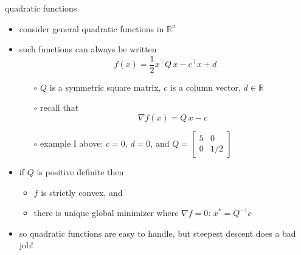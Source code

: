 \documentclass[10pt,hyperref]{beamer}
\newcommand{\grad}{\nabla}
\newcommand{\RR}{\mathbb{R}}
\begin{document}
\begin{frame}{quadratic functions}

\begin{itemize}
\item consider general quadratic functions in $\RR^n$
\item such functions can always be written
    $$f(x) = \frac{1}{2} x^\top Q\, x - c^\top x + d$$
    \begin{itemize}
    \vspace{-3mm}
    \item[$\circ$] $Q$ is a symmetric square matrix, $c$ is a column vector, $d\in \RR$
    \item[$\circ$] recall that
        $$\grad f(x) = Q\, x - c$$
    \item[$\circ$] example I above: $c=0$, $d=0$, and $\displaystyle Q = \begin{bmatrix} 5 & 0 \\ 0 & 1/2 \end{bmatrix}$
    \end{itemize}
\item if $Q$ is positive definite then
    \begin{itemize}
    \item $f$ is strictly convex, and
    \item there is unique global minimizer where $\grad f=0$: \qquad $x^* = Q^{-1} c$
    \end{itemize}
\item so quadratic functions are easy to handle, but steepest descent does a bad job!
\end{itemize}
\end{frame}
\end{document}
